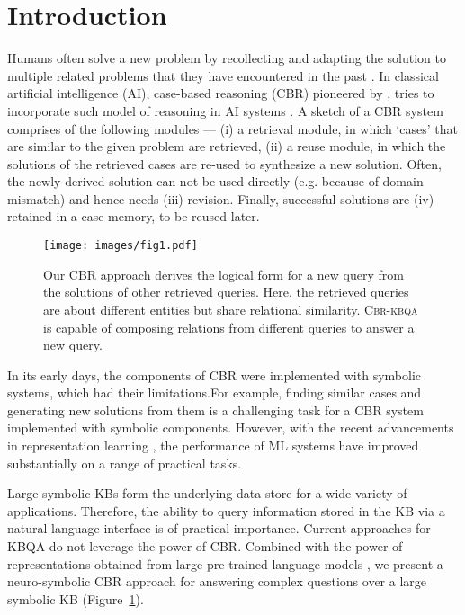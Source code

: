 \documentclass{article}
\newcommand{\alg}{\textsc{Cbr-kbqa}\xspace}
\begin{document}
\section{Introduction}
\label{sec:intro}
Humans often solve a new problem by recollecting and adapting the solution to multiple related problems that they have encountered in the past \cite{ross1984remindings,lancaster1987problem,schmidt1990cognitive}. In classical artificial intelligence (AI), case-based reasoning (CBR) pioneered by \citet{schank1982dynamic}, tries to incorporate such model of reasoning in AI systems \cite{kolodner1983maintaining,rissland1983examples,leake1996cbr}. A sketch of a CBR system \cite{aamodt1994case} comprises of the following modules ---  (i) a retrieval module, in which `cases' that are similar to the given problem are retrieved, (ii) a reuse module, in which the solutions of the retrieved cases are re-used to synthesize a new solution. Often, the newly derived solution can not be used directly (e.g. because of domain mismatch) and hence needs (iii) revision. Finally, successful solutions are (iv) retained in a case memory, to be reused later. 
 

\begin{figure}
    \centering
    \texttt{[image: images/fig1.pdf]}
    \vspace{-5mm}
    \caption{Our CBR approach derives the logical form for a new query from the solutions of other retrieved queries. Here, the retrieved queries are about different entities but share relational similarity. \alg is capable of composing relations from different queries to answer a new query. }
    \label{fig:intro1}
    \vspace{-3mm}
\end{figure}


In its early days, the components of CBR were implemented with symbolic systems, which had their limitations.For example, finding similar cases and generating new solutions from them is a challenging task for a CBR system implemented with symbolic components. However, with the recent advancements in representation learning \cite{lecun2015deep}, the performance of ML systems have improved substantially on a range of practical tasks.  

Large symbolic KBs form the underlying data store for a wide variety of applications. Therefore, the ability to query information stored in the KB via a natural language interface is of practical importance. Current approaches for KBQA \cite{berant2013semantic,sun2019pullnet} do not leverage the power of CBR. Combined with the power of representations obtained from large pre-trained language models \citep[inter-alia]{devlin2018bert,liu2019roberta,t5}, we present a neuro-symbolic CBR approach for answering complex questions over a large symbolic KB (Figure~\ref{fig:intro1}).
\end{document}
